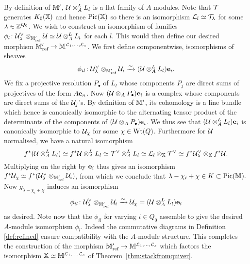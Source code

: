 \documentclass[12pt]{amsart}
\newcommand{\Wt}{\textup{Wt}}
\begin{document}
By definition of $\mathbb{M}'$, $\mathcal{U} \otimes_A^L L_l$ is a flat family of $A$-modules. Note that $\mathcal{T}$ generates $K_0(\mathbb{X})$ and hence $\operatorname{Pic}(\mathbb{X})$ so there is an isomorphism $\mathcal{L}_l \simeq \mathcal{T}_{\lambda}$ for some $\lambda \in \mathbb{Z}^{Q_0}$. We wish to construct an isomorphism of families $\phi_l \colon \mathcal{U}_{\lambda}^{\vee} \otimes_{\mathbb{M}'_{\text{ref}}} \mathcal{U} \simeq \mathcal{U} \otimes_A^L L_l$ for each $l$. 
This would then define our desired morphism $\mathbb{M}'_{\text{ref}} \rightarrow \mathbb{M}^{\mathcal{L}_1,\ldots,\mathcal{L}_s}$. We first define componentwise, isomorphisms of sheaves 
$$ \phi_{il} \colon \mathcal{U}_{\lambda}^{\vee} \otimes_{\mathbb{M}'_{\text{ref}}} \mathcal{U}_i \xrightarrow{\sim} (\mathcal{U} \otimes_A^L L_l)\mathbf{e}_i.$$
We fix a projective resolution $P_{\bullet}$ of $L_l$ whose components $P_j$ are direct sums of projectives of the form $A\mathbf{e}_n$. Now $(\mathcal{U} \otimes_A P_{\bullet})\mathbf{e}_i$ is a complex whose components are direct sums of the $\mathcal{U}_j$'s. By definition of $\mathbb{M}'$, its cohomology is a line bundle which hence is canonically isomorphic to the alternating tensor product of the determinants of the components of $(\mathcal{U} \otimes_A P_{\bullet})\mathbf{e}_i$. We thus see that $(\mathcal{U} \otimes_A^L L_l)\mathbf{e}_i$ is canonically isomorphic to $\mathcal{U}_{\chi}$ for some $\chi \in \Wt(Q)$.
Furthermore for $\mathcal{U}$ normalised, we have a natural isomorphism
\begin{equation} \label{eq:natisolinebdls}
f^*(\mathcal{U} \otimes_A^L L_l) \simeq f^* \mathcal{U} \otimes_A^L L_l \simeq 
\mathcal{T}^{\vee} \otimes_A^L L_l \simeq \mathcal{L}_l \otimes_{\mathbb{X}} \mathcal{T}^{\vee} \simeq 
f^*\mathcal{U}_{\lambda}^{\vee} \otimes_{\mathbb{X}} f^* \mathcal{U}.
\end{equation}
Multiplying on the right by $\mathbf{e}_i$ thus gives an isomorphism  $f^*\mathcal{U}_{\chi} \simeq f^*(\mathcal{U}_{\lambda}^{\vee} \otimes_{\mathbb{M}'_{\text{ref}}} \mathcal{U}_i)$, from which we conclude that $\lambda -\chi_i + \chi \in K \subset \operatorname{Pic}(\mathbb{M}).$
Now $g_{\lambda -\chi_i + \chi}$ induces an isomorphism 
$$\phi_{il} \colon \mathcal{U}_{\lambda}^{\vee} \otimes_{\mathbb{M}'_{\text{ref}}} \mathcal{U}_i \xrightarrow{\sim} \mathcal{U}_{\chi} = (\mathcal{U} \otimes_A^L L_l)\mathbf{e}_i$$
as desired. 
Note now that the $\phi_{il}$ for varying $i \in Q_0$ assemble to give the desired $A$-module isomorphism $\phi_l$. Indeed the commutative diagrams in Definition \ref{def:refined} ensure compatibility with the $A$-module structure. This completes the construction of the morphism $\mathbb{M}'_{\text{ref}} \rightarrow \mathbb{M}^{\mathcal{L}_1,\ldots,\mathcal{L}_s}$ which factors the isomorphism $\mathbb{X} \simeq \mathbb{M}^{\mathcal{L}_1,\ldots,\mathcal{L}_s}$ of Theorem~\ref{thm:stackfromquiver}.
\end{document}

